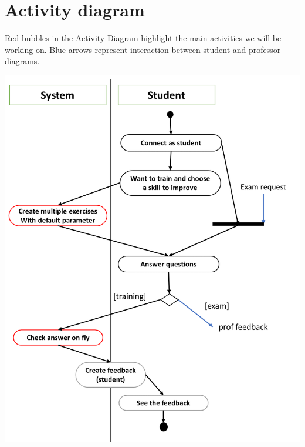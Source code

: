 \documentclass{article}
\begin{document}
\section{Activity diagram}
Red bubbles in the Activity Diagram highlight the main activities we will be working on. Blue arrows represent interaction between student and professor diagrams.\\
\begin{center}
    \includegraphics[scale=0.40]{studentAD.png}
\end{center}
\end{document}
